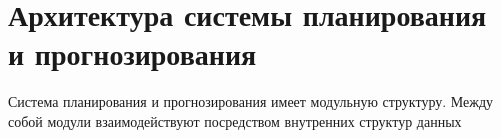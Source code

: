 \section{Архитектура системы планирования и прогнозирования}
\indent Система планирования и прогнозирования имеет модульную структуру.
Между собой модули взаимодействуют посредством внутренних структур данных
